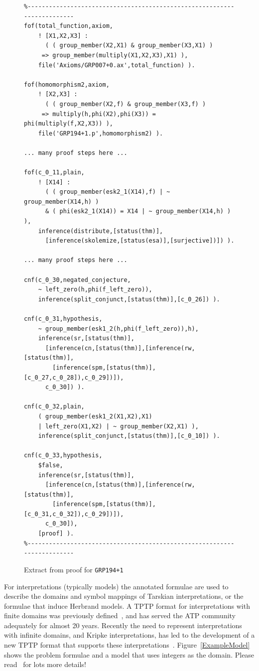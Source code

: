 \documentclass[runningheads]{llncs}
\begin{document}
\begin{figure}[h!]
\centering
{\footnotesize
{\setlength{\baselineskip}{3mm}
\begin{verbatim}
%------------------------------------------------------------------------
fof(total_function,axiom,
    ! [X1,X2,X3] :
      ( ( group_member(X2,X1) & group_member(X3,X1) )
     => group_member(multiply(X1,X2,X3),X1) ),
    file('Axioms/GRP007+0.ax',total_function) ).

fof(homomorphism2,axiom,
    ! [X2,X3] :
      ( ( group_member(X2,f) & group_member(X3,f) )
     => multiply(h,phi(X2),phi(X3)) = phi(multiply(f,X2,X3)) ),
    file('GRP194+1.p',homomorphism2) ).

... many proof steps here ...

fof(c_0_11,plain,
    ! [X14] :
      ( ( group_member(esk2_1(X14),f) | ~ group_member(X14,h) )
      & ( phi(esk2_1(X14)) = X14 | ~ group_member(X14,h) ) ),
    inference(distribute,[status(thm)],
      [inference(skolemize,[status(esa)],[surjective])]) ).

... many proof steps here ...

cnf(c_0_30,negated_conjecture,
    ~ left_zero(h,phi(f_left_zero)),
    inference(split_conjunct,[status(thm)],[c_0_26]) ).

cnf(c_0_31,hypothesis,
    ~ group_member(esk1_2(h,phi(f_left_zero)),h),
    inference(sr,[status(thm)],
      [inference(cn,[status(thm)],[inference(rw,[status(thm)],
        [inference(spm,[status(thm)],[c_0_27,c_0_28]),c_0_29])]),
      c_0_30]) ).

cnf(c_0_32,plain,
    ( group_member(esk1_2(X1,X2),X1)
    | left_zero(X1,X2) | ~ group_member(X2,X1) ),
    inference(split_conjunct,[status(thm)],[c_0_10]) ).

cnf(c_0_33,hypothesis,
    $false,
    inference(sr,[status(thm)],
      [inference(cn,[status(thm)],[inference(rw,[status(thm)],
        [inference(spm,[status(thm)],[c_0_31,c_0_32]),c_0_29])]),
      c_0_30]),
    [proof] ).
%------------------------------------------------------------------------
\end{verbatim}
}}
\caption{Extract from proof for {\tt GRP194+1}}
\label{ExampleDerivationFormulae}
\end{figure}

For interpretations (typically models) the annotated formulae are used to describe the domains
and symbol mappings of Tarskian interpretations, or the formulae that induce Herbrand models.
A TPTP format for interpretations with finite domains was previously defined~\cite{SS+06}, 
and has served the ATP community adequately for almost 20 years. 
Recently the need to represent interpretations with infinite domains, and Kripke interpretations, 
has led to the development of a new TPTP format that supports these interpretations~\cite{SSP24}.
Figure~\ref{ExampleModel} shows the problem formulae and a model that uses integers as the domain.
Please read~\cite{SSP24} for lots more details!
\end{document}

